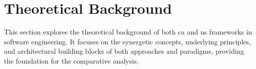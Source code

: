 \section{Theoretical Background}

This section explores the theoretical background of both \gls{ca} and \gls{ns} frameworks
in software engineering. It focuses on the synergetic concepts, underlying principles, and
architectural building blocks of both approaches and paradigms, providing the foundation
for the comparative analysis.

% 
% 
% 
